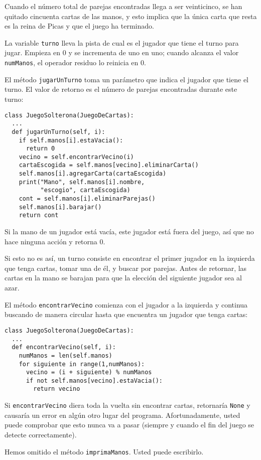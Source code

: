 Cuando el número total de parejas encontradas llega a ser veinticinco,
se han quitado cincuenta cartas de las manos, y esto implica que la
única carta que resta es la reina de Picas y que el juego ha terminado.

La variable \texttt{turno} lleva la pista de cual es el jugador que
tiene el turno para jugar. Empieza en 0 y se incrementa de uno en
uno; cuando alcanza el valor \texttt{numManos}, el operador residuo
lo reinicia en 0.

El método \texttt{jugarUnTurno} toma un parámetro que indica el jugador
que tiene el turno. El valor de retorno es el número de parejas encontradas
durante este turno:

\begin{verbatim}
class JuegoSolterona(JuegoDeCartas):
  ...
  def jugarUnTurno(self, i):
    if self.manos[i].estaVacia():
      return 0
    vecino = self.encontrarVecino(i)
    cartaEscogida = self.manos[vecino].eliminarCarta()
    self.manos[i].agregarCarta(cartaEscogida)
    print("Mano", self.manos[i].nombre, 
          "escogio", cartaEscogida)
    cont = self.manos[i].eliminarParejas()
    self.manos[i].barajar()
    return cont
\end{verbatim}
 Si la mano de un jugador está vacía, este jugador está fuera del
juego, así que no hace ninguna acción y retorna 0.

Si esto no es así, un turno consiste en encontrar el primer jugador
en la izquierda que tenga cartas, tomar una de él, y buscar por parejas.
Antes de retornar, las cartas en la mano se barajan para que la elección
del siguiente jugador sea al azar.

El método \texttt{encontrarVecino} comienza con el jugador a la izquierda
y continua buscando de manera circular hasta que encuentra un jugador
que tenga cartas:
\begin{verbatim}
class JuegoSolterona(JuegoDeCartas):
  ...
  def encontrarVecino(self, i):
    numManos = len(self.manos)
    for siguiente in range(1,numManos):
      vecino = (i + siguiente) % numManos
      if not self.manos[vecino].estaVacia():
        return vecino
\end{verbatim}

Si \texttt{encontrarVecino} diera toda la vuelta sin encontrar cartas,
retornaría \texttt{None} y causaría un error en algún otro lugar del
programa. Afortunadamente, usted puede comprobar que esto nunca va
a pasar (siempre y cuando el fin del juego se detecte correctamente).

Hemos omitido el método \texttt{imprimaManos}. Usted puede escribirlo.

